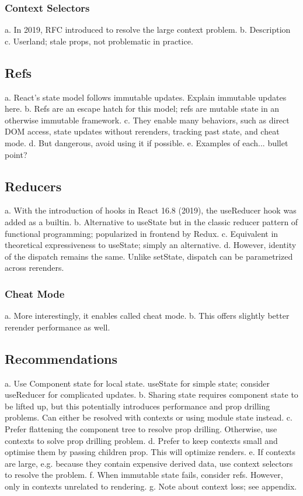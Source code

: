 \documentclass{article}
\begin{document}
\subsubsection{Context Selectors}

a. In 2019, RFC introduced to resolve the large context problem.
b. Description
c. Userland; stale props, not problematic in practice.

\subsection{Refs}

a. React's state model follows immutable updates. Explain immutable updates here.
b. Refs are an escape hatch for this model; refs are mutable state in an otherwise immutable framework.
c. They enable many behaviors, such as direct DOM access, state updates without rerenders, tracking past state, and cheat mode.
d. But dangerous, avoid using it if possible.
e. Examples of each... bullet point?

\subsection{Reducers}

a. With the introduction of hooks in React 16.8 (2019), the useReducer hook was added as a builtin.
b. Alternative to useState but in the classic reducer pattern of functional programming; popularized in frontend by Redux.
c. Equivalent in theoretical expressiveness to useState; simply an alternative.
d. However, identity of the dispatch remains the same. Unlike setState, dispatch can be parametrized across rerenders.

\subsubsection{Cheat Mode}

a. More interestingly, it enables called cheat mode.
b. This offers slightly better rerender performance as well.

\subsection{Recommendations}

a. Use Component state for local state. useState for simple state; consider useReducer for complicated updates.
b. Sharing state requires component state to be lifted up, but this potentially introduces performance and prop drilling problems. Can either be resolved with contexts or using module state instead.
c. Prefer flattening the component tree to resolve prop drilling. Otherwise, use contexts to solve prop drilling problem.
d. Prefer to keep contexts small and optimise them by passing children prop. This will optimize renders.
e. If contexts are large, e.g. because they contain expensive derived data, use context selectors to resolve the problem.
f. When immutable state fails, consider refs. However, only in contexts unrelated to rendering.
g. Note about context loss; see appendix.
\end{document}
